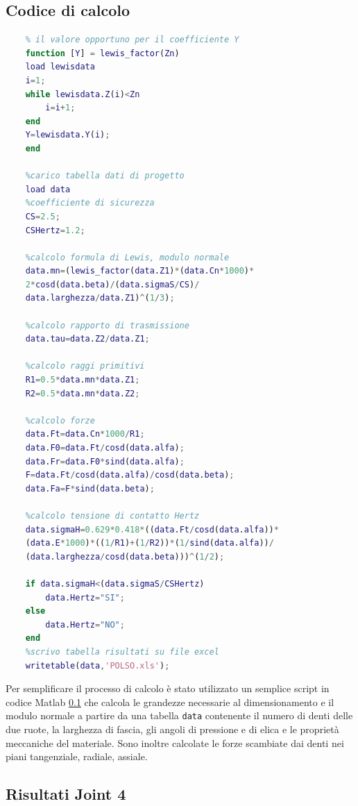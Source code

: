 \documentclass[%
corpo=11pt,
twoside,
 stile=classica,
oldstyle,
greek,%
]{toptesi}
\begin{document}
	\subsection{Codice di calcolo}
	\label{matlabcode}
	\begin{lstlisting}[language=Matlab]
	% La funzione lewis_factor ricerca all'iterno della tabella lewisdata
	% il valore opportuno per il coefficiente Y
	function [Y] = lewis_factor(Zn)
	load lewisdata
	i=1;
	while lewisdata.Z(i)<Zn
		i=i+1;
	end
	Y=lewisdata.Y(i);
	end
	
	%carico tabella dati di progetto 
	load data
	%coefficiente di sicurezza
	CS=2.5;
	CSHertz=1.2;
	
	%calcolo formula di Lewis, modulo normale
	data.mn=(lewis_factor(data.Z1)*(data.Cn*1000)*
	2*cosd(data.beta)/(data.sigmaS/CS)/
	data.larghezza/data.Z1)^(1/3);
	
	%calcolo rapporto di trasmissione
	data.tau=data.Z2/data.Z1;
	
	%calcolo raggi primitivi 
	R1=0.5*data.mn*data.Z1;
	R2=0.5*data.mn*data.Z2;
	
	%calcolo forze
	data.Ft=data.Cn*1000/R1;
	data.F0=data.Ft/cosd(data.alfa);
	data.Fr=data.F0*sind(data.alfa);
	F=data.Ft/cosd(data.alfa)/cosd(data.beta);
	data.Fa=F*sind(data.beta);
	
	%calcolo tensione di contatto Hertz
	data.sigmaH=0.629*0.418*((data.Ft/cosd(data.alfa))*
	(data.E*1000)*((1/R1)+(1/R2))*(1/sind(data.alfa))/
	(data.larghezza/cosd(data.beta)))^(1/2);
	
	if data.sigmaH<(data.sigmaS/CSHertz)
		data.Hertz="SI";
	else
		data.Hertz="NO";
	end
	%scrivo tabella risultati su file excel
	writetable(data,'POLSO.xls');
	\end{lstlisting}
	
		Per semplificare il processo di calcolo è stato utilizzato un semplice script in codice Matlab \ref{matlabcode} che calcola le grandezze necessarie al dimensionamento e il modulo normale a partire da una tabella \verb|data| contenente il numero di denti delle due ruote, la larghezza di fascia, gli angoli di pressione e di elica e le proprietà meccaniche del materiale. Sono inoltre calcolate le forze scambiate dai denti nei piani tangenziale, radiale, assiale.
		
		
		
		\subsection{Risultati Joint 4}
		
\end{document}
